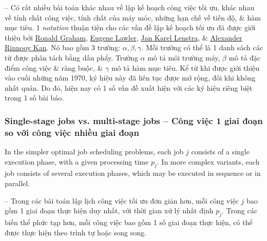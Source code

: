 \documentclass{article}
\begin{document}
-- Có rất nhiều bài toán khác nhau về lập kế hoạch công việc tối ưu, khác nhau về tính chất công việc, tính chất của máy móc, những hạn chế về tiến độ, \& hàm mục tiêu. 1 {\it notation} thuận tiện cho các vấn đề lập kế hoạch tối ưu đã được giới thiệu bởi \href{https://en.wikipedia.org/wiki/Ronald_Graham}{\sc Ronald Graham}, \href{https://en.wikipedia.org/wiki/Eugene_Lawler}{\sc Eugene Lawler}, \href{https://en.wikipedia.org/wiki/Jan_Karel_Lenstra}{\sc Jan Karel Lenstra}, \& \href{https://en.wikipedia.org/wiki/Alexander_Rinnooy_Kan}{\sc Alexander Rinnooy Kan}. Nó bao gồm 3 trường: $\alpha,\beta,\gamma$. Mỗi trường có thể là 1 danh sách các từ được phân tách bằng dấu phẩy. Trường $\alpha$ mô tả môi trường máy, $\beta$ mô tả đặc điểm công việc \& ràng buộc, \& $\gamma$ mô tả hàm mục tiêu. Kể từ khi được giới thiệu vào cuối những năm 1970, ký hiệu này đã liên tục được mở rộng, đôi khi không nhất quán. Do đó, hiện nay có 1 số vấn đề xuất hiện với các ký hiệu riêng biệt trong 1 số bài báo.


\subsubsection{Single-stage jobs vs. multi-stage jobs -- Công việc 1 giai đoạn so với công việc nhiều giai đoạn}
In the simpler optimal job scheduling problems, each job $j$ consists of a single execution phase, with a given processing time $p_j$. In more complex variants, each job consists of several execution phases, which may be executed in sequence or in parallel.

-- Trong các bài toán lập lịch công việc tối ưu đơn giản hơn, mỗi công việc $j$ bao gồm 1 giai đoạn thực hiện duy nhất, với thời gian xử lý nhất định $p_j$. Trong các biến thể phức tạp hơn, mỗi công việc bao gồm 1 số giai đoạn thực hiện, có thể được thực hiện theo trình tự hoặc song song.

\end{document}
